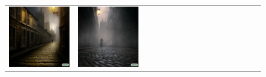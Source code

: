 \begin{figure}[ht!]
\begin{adjustwidth}{-0.8in}{-0.5in}
\begin{tabular}{cccccccccccccccccccc}
\multicolumn{3}{c}{\includegraphics[width=\twobytwocolwidth\textwidth]{figures/cherries/gothic_0.jpg}} &
\multicolumn{3}{c}{\includegraphics[width=\twobytwocolwidth\textwidth]{figures/cherries/gothic_1.jpg}} &&

\end{tabular}
\end{adjustwidth}
\end{figure}
